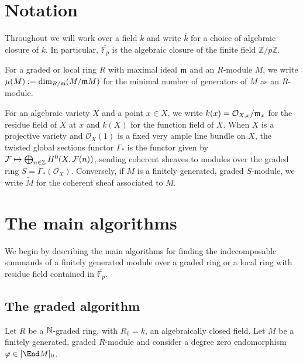 \documentclass[12pt]{article}
\let\wtilde\widetilde
\def\cF{\mathcal F}
\def\OO{\mathcal O}
\def\FF{\mathbb F}
\def\ZZ{\mathbb Z}
\theoremstyle{theorem}
\numberwithin{thm}{section}
\theoremstyle{definition}
\newcommand{\mahrud}[1]{{\color{ForestGreen} \sf $\blacklozenge$ Mahrud: [#1]}}
\begin{document}
\section{Notation}
\label{sec:notation}

Throughout we will work over a field $k$ and write $\overline k$ for a choice of algebraic closure of $k$. \linebreak In particular, $\overline{\FF_p}$ is the algebraic closure of the finite field $\ZZ/p\ZZ$.

For a graded or local ring $R$ with maximal ideal $\mathfrak m$ and an $R$-module $M$, we write $\mu(M):=\dim_{R/\mathfrak m}(M/\mathfrak m M)$ for the minimal number of generators of $M$ as an $R$-module.

For an algebraic variety $X$ and a point $x\in X$, we write $k(x)=\OO_{X,x}/\m_x$ for the residue field of $X$ at $x$ and $k(X)$ for the function field of $X$.
%
When $X$ is a projective variety and $\OO_X(1)$ is a fixed very ample line bundle on $X$, the twisted global sections functor $\Gamma_*$ is the functor given by $\cF \mapsto \bigoplus_{n\in \Z} H^0(X, \cF(n))$, sending coherent sheaves to modules over the graded ring $S = \Gamma_*(\OO_X)$. Conversely, if $M$ is a finitely generated, graded $S$-module, we write $\wtilde M$ for the coherent sheaf associated to $M$.

\section{The main algorithms}
\label{sec:main-algs}

We begin by describing the main algorithms for finding the indecomposable summands of a finitely generated module over a graded ring or a local ring with residue field contained in $\overline{\FF_p}$.

\subsection{The graded algorithm}\label{sec:main-alg-new}

Let $R$ be a $\mathbb N$-graded ring, with $R_0 = k$, an algebraically closed field.
Let $M$ be a finitely generated, graded $R$-module and consider a degree zero endomorphism $\phi \in [\End M]_0$.
\end{document}
